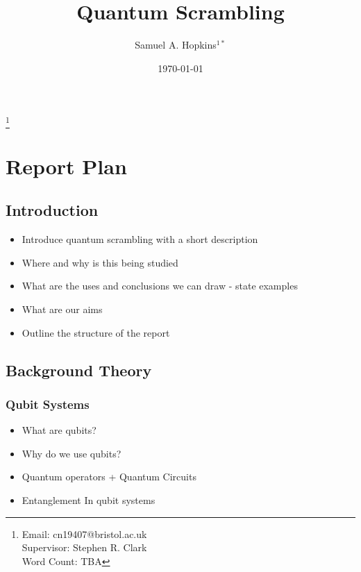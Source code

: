 \documentclass[nofootinbib]{revtex4-2}
\begin{document}
\title{Quantum Scrambling}

\author{Samuel A. Hopkins$^{1*}$}
\date{\today}
\thanks{Email: cn19407@bristol.ac.uk\\
Supervisor: Stephen R. Clark\\
Word Count: TBA
}

\maketitle

\clearpage
\tableofcontents



% 
%
\section{Report Plan}
    \subsection{Introduction}
        \begin{itemize}
            \color{ForestGreen}
            \item Introduce quantum scrambling with a short description
            \item Where and why is this being studied
            \item What are the uses and conclusions we can draw - state examples 
            \item What are our aims
            \item Outline the structure of the report
        \end{itemize}


    \subsection{Background Theory}
        \subsubsection{Qubit Systems}
            \begin{itemize}
                \color{ForestGreen}
                \item What are qubits?
                \item Why do we use qubits?
                \item Quantum operators + Quantum Circuits
                \item Entanglement In qubit systems
            \end{itemize}
\end{document}
